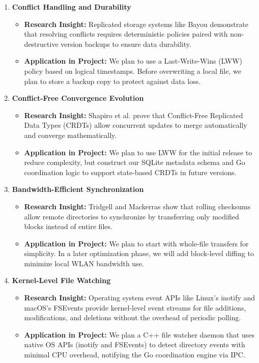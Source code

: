 \begin{enumerate}
    \item \textbf{Conflict Handling and Durability}
    \begin{itemize}
        \item \textbf{Research Insight:} Replicated storage systems like Bayou \cite{bayou1995} demonstrate that resolving conflicts requires deterministic policies paired with non-destructive version backups to ensure data durability.
        \item \textbf{Application in Project:} We plan to use a Last-Write-Wins (LWW) policy based on logical timestamps. Before overwriting a local file, we plan to store a backup copy to protect against data loss.
    \end{itemize}

    \item \textbf{Conflict-Free Convergence Evolution}
    \begin{itemize}
        \item \textbf{Research Insight:} Shapiro et al. \cite{shapiro2011} prove that Conflict-Free Replicated Data Types (CRDTs) allow concurrent updates to merge automatically and converge mathematically.
        \item \textbf{Application in Project:} We plan to use LWW for the initial release to reduce complexity, but construct our SQLite metadata schema and Go coordination logic to support state-based CRDTs in future versions.
    \end{itemize}

    \item \textbf{Bandwidth-Efficient Synchronization}
    \begin{itemize}
        \item \textbf{Research Insight:} Tridgell and Mackerras \cite{rsync1996} show that rolling checksums allow remote directories to synchronize by transferring only modified blocks instead of entire files.
        \item \textbf{Application in Project:} We plan to start with whole-file transfers for simplicity. In a later optimization phase, we will add block-level diffing to minimize local WLAN bandwidth use.
    \end{itemize}

    \item \textbf{Kernel-Level File Watching}
    \begin{itemize}
        \item \textbf{Research Insight:} Operating system event APIs like Linux's inotify \cite{inotify7} and macOS's FSEvents \cite{fsevents} provide kernel-level event streams for file additions, modifications, and deletions without the overhead of periodic polling.
        \item \textbf{Application in Project:} We plan a C++ file watcher daemon that uses native OS APIs (inotify and FSEvents) to detect directory events with minimal CPU overhead, notifying the Go coordination engine via IPC.
    \end{itemize}


\end{enumerate}
